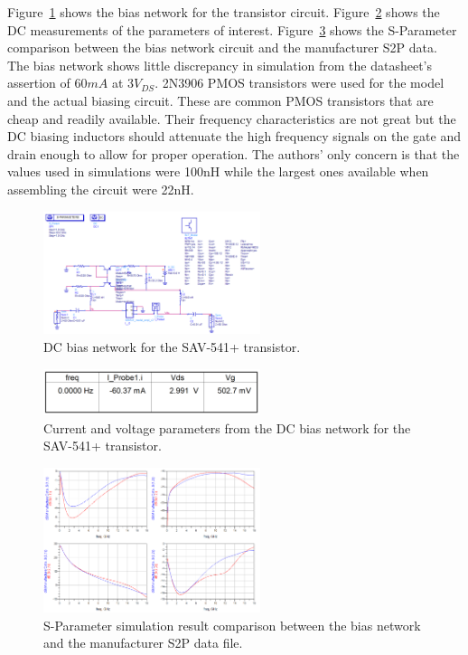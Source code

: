 \documentclass[conference]{IEEEtran}
\begin{document}
Figure~\ref{fig:dccircuit} shows the bias network for the transistor circuit. Figure~\ref{fig:dcvalues} shows the DC measurements of the parameters of interest. Figure~\ref{fig:sparamresult} shows the S-Parameter comparison between the bias network circuit and the manufacturer S2P data. The bias network shows little discrepancy in simulation from the datasheet's assertion of $60mA$ at $3V_{DS}$. 2N3906 PMOS transistors were used for the model and the actual biasing circuit. These are common PMOS transistors that are cheap and readily available. Their frequency characteristics are not great but the DC biasing inductors should attenuate the high frequency signals on the gate and drain enough to allow for proper operation. The authors' only concern is that the values used in simulations were 100nH while the largest ones available when assembling the circuit were 22nH. 

\begin{figure}[!h]
\centering
\includegraphics[width=2.5in]{pics/DCBiasNetwork.png}
\caption{DC bias network for the SAV-541+ transistor.}
\label{fig:dccircuit}
\end{figure}

\begin{figure}[!h]
\centering
\includegraphics[width=2.5in]{pics/DCBiasResults.png}
\caption{Current and voltage parameters from the DC bias network for the SAV-541+ transistor.}
\label{fig:dcvalues}
\end{figure}

\begin{figure}[!h]
\centering
\includegraphics[width=2.5in]{pics/SParameterComparison.png}
\caption{S-Parameter simulation result comparison between the bias network and the manufacturer S2P data file.}
\label{fig:sparamresult}
\end{figure}
\end{document}
